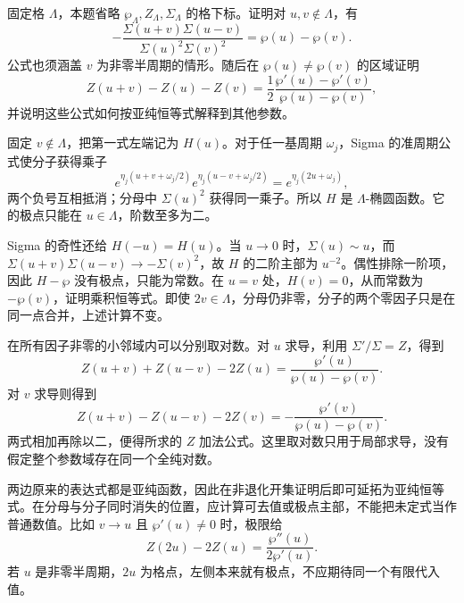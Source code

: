 \begin{exercise}\label{b3:ex:22-7}
固定格 \(\Lambda\)，本题省略 \(\wp_\Lambda,Z_\Lambda,\Sigma_\Lambda\) 的格下标。证明对 \(u,v\notin\Lambda\)，有
\[
 -\frac{\Sigma(u+v)\Sigma(u-v)}{\Sigma(u)^2\Sigma(v)^2}
 =\wp(u)-\wp(v).
\]
公式也须涵盖 \(v\) 为非零半周期的情形。随后在 \(\wp(u)\ne\wp(v)\) 的区域证明
\[
 Z(u+v)-Z(u)-Z(v)
 =\frac12\frac{\wp'(u)-\wp'(v)}{\wp(u)-\wp(v)},
\]
并说明这些公式如何按亚纯恒等式解释到其他参数。
\end{exercise}
\begin{solution}
固定 \(v\notin\Lambda\)，把第一式左端记为 \(H(u)\)。对于任一基周期 \(\omega_j\)，Sigma 的准周期公式使分子获得乘子
\[
 e^{\eta_j(u+v+\omega_j/2)}
 e^{\eta_j(u-v+\omega_j/2)}
 =e^{\eta_j(2u+\omega_j)},
\]
两个负号互相抵消；分母中 \(\Sigma(u)^2\) 获得同一乘子。所以 \(H\) 是 \(\Lambda\)-椭圆函数。它的极点只能在 \(u\in\Lambda\)，阶数至多为二。

Sigma 的奇性还给 \(H(-u)=H(u)\)。当 \(u\to0\) 时，\(\Sigma(u)\sim u\)，而
\(\Sigma(u+v)\Sigma(u-v)\to-\Sigma(v)^2\)，故 \(H\) 的二阶主部为 \(u^{-2}\)。偶性排除一阶项，因此 \(H-\wp\) 没有极点，只能为常数。在 \(u=v\) 处，\(H(v)=0\)，从而常数为 \(-\wp(v)\)，证明乘积恒等式。即使 \(2v\in\Lambda\)，分母仍非零，分子的两个零因子只是在同一点合并，上述计算不变。

在所有因子非零的小邻域内可以分别取对数。对 \(u\) 求导，利用 \(\Sigma'/\Sigma=Z\)，得到
\[
 Z(u+v)+Z(u-v)-2Z(u)
 =\frac{\wp'(u)}{\wp(u)-\wp(v)}.
\]
对 \(v\) 求导则得到
\[
 Z(u+v)-Z(u-v)-2Z(v)
 =-\frac{\wp'(v)}{\wp(u)-\wp(v)}.
\]
两式相加再除以二，便得所求的 \(Z\) 加法公式。这里取对数只用于局部求导，没有假定整个参数域存在同一个全纯对数。

两边原来的表达式都是亚纯函数，因此在非退化开集证明后即可延拓为亚纯恒等式。在分母与分子同时消失的位置，应计算可去值或极点主部，不能把未定式当作普通数值。比如 \(v\to u\) 且 \(\wp'(u)\ne0\) 时，极限给
\[
 Z(2u)-2Z(u)=\frac{\wp''(u)}{2\wp'(u)}.
\]
若 \(u\) 是非零半周期，\(2u\) 为格点，左侧本来就有极点，不应期待同一个有限代入值。
\end{solution}

